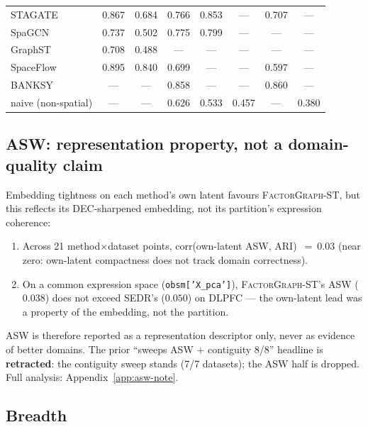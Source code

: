 \documentclass[10pt,letterpaper]{article}
\begin{document}
\begin{table}[t]
\begin{tabular}{@{}lccccccc@{}}
    STAGATE             & 0.867 & 0.684 & 0.766 & 0.853 & ---   & 0.707 & ---   \\
    SpaGCN              & 0.737 & 0.502 & 0.775 & 0.799 & ---   & ---   & ---   \\
    GraphST             & 0.708 & 0.488 & ---   & ---   & ---   & ---   & ---   \\
    SpaceFlow           & 0.895 & 0.840 & 0.699 & ---   & ---   & 0.597 & ---   \\
    BANKSY              & ---   & ---   & 0.858 & ---   & ---   & 0.860 & ---   \\
    naive (non-spatial) & ---   & ---   & 0.626 & 0.533 & 0.457 & ---   & 0.380 \\
    \bottomrule
  \end{tabular}
\end{table}

\subsection{ASW: representation property, not a domain-quality claim}
\label{sec:asw}

Embedding tightness on each method's own latent favours \textsc{FactorGraph-ST}, but
this reflects its DEC-sharpened embedding, not its partition's expression coherence:

\begin{enumerate}[leftmargin=1.4em,itemsep=2pt]
  \item Across 21 method$\times$dataset points, corr(own-latent ASW, ARI)~$=~0.03$
        (near zero: own-latent compactness does not track domain correctness).
  \item On a common expression space (\texttt{obsm['X\_pca']}), \textsc{FactorGraph-ST}'s
        ASW ($0.038$) does not exceed SEDR's ($0.050$) on DLPFC --- the own-latent lead
        was a property of the embedding, not the partition.
\end{enumerate}

\noindent ASW is therefore reported as a representation descriptor only, never as evidence
of better domains. The prior ``sweeps ASW $+$ contiguity 8/8'' headline is
\textbf{retracted}: the contiguity sweep stands (7/7 datasets); the ASW half is dropped.
Full analysis: Appendix~\ref{app:asw-note}.

\subsection{Breadth}
\label{sec:breadth}
\end{document}
